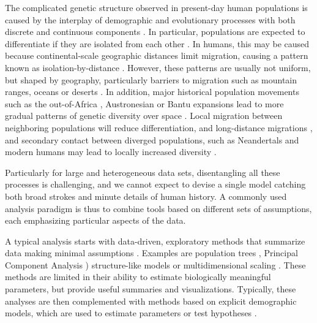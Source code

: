 \documentclass[12pt,fullpage, a4paper]{article}
\begin{document}
The complicated genetic structure observed in present-day human populations \citep{the2015, mallick2016} is caused by the interplay of demographic and evolutionary processes with both discrete and continuous components \citep{serre2004, rosenberg2005, bradburd2018, peter2020a, gopalan2022}. 
In particular, populations are expected to differentiate if they are isolated from each other \citep{wahlund1928,cavalli-sforza1975}. In humans, this may be caused because continental-scale geographic distances limit migration, causing a pattern known as isolation-by-distance \citep{wright1943, slatkin1985}. However, these patterns are usually not uniform, but shaped by geography, particularly barriers  to migration such as mountain ranges, oceans or deserts \citep{cavalli-sforza1994, barbujani1990}. In addition,  major historical population movements such as the out-of-Africa \citep{ramachandran2005}, Austronesian \citep{stoneking2016} or Bantu expansions \citep{li2014} lead to more gradual patterns of genetic diversity over space \citep{francois2010}. Local migration between neighboring populations will reduce differentiation, and long-distance migrations \citep{alves2016}, and secondary contact between diverged populations, such as Neandertals and modern humans \citep{green2010} may lead to locally increased diversity \citep{boca2020}.

Particularly for large and heterogeneous data sets, disentangling all these processes is challenging, and we cannot expect to devise a single model catching both broad strokes and minute details of human history. A commonly used analysis paradigm is thus to combine tools based on different sets of assumptions, each emphasizing particular aspects of the data.

A typical analysis starts with data-driven, exploratory methods that summarize data making minimal assumptions \citep[e.g.][]{schraiber2015}. Examples are population trees \citep{cavalli-sforza1967, felsenstein1973, cavalli-sforza1975}, Principal Component Analysis \citep[PCA, ][]{cavalli-sforza1994, jombart2009, patterson2006}) structure-like models \citep{pritchard2000, alexander2009} or multidimensional scaling \citep[MDS, ][]{lessa1990}. These methods are limited in their ability to estimate biologically meaningful parameters, but provide useful summaries and visualizations. Typically, these analyses are then complemented with methods based on explicit demographic models, which are used to estimate parameters or test hypotheses \citep{gutenkunst2009, excoffier2013, kamm2015}. 
\end{document}
